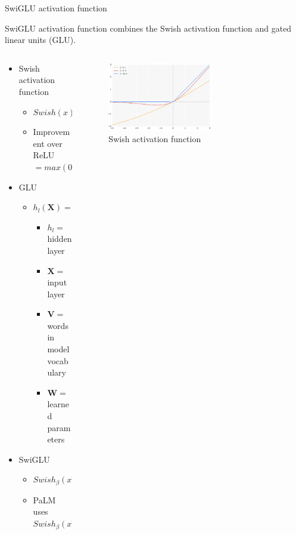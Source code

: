 \documentclass{beamer}
\begin{document}
\begin{frame}{SwiGLU activation function\cite{swiglu}}
  \scriptsize

  SwiGLU activation function combines the Swish activation function\cite{swish} and gated linear units (GLU)\cite{glu}.

  \begin{columns}
    \begin{column}{0.55\textwidth}
      \begin{itemize}
        \item Swish activation function
        \begin{itemize}
          \item $Swish(x) = x\sigma(\beta x), \sigma(z) = (1+e^{-z})^{-1}$
          \item Improvement over ReLU $=max(0,x)$
        \end{itemize}
        \item GLU
        \begin{itemize}
          \item $h_l(\mathbf{X}) = (\mathbf{X} * \mathbf{W}+ b) \otimes (\mathbf{X} * \mathbf{V} + c)$
          \begin{itemize}
            \item $h_l = $ hidden layer
            \item $\mathbf{X} = $ input layer
            \item $\mathbf{V} = $ words in model vocabulary
            \item $\mathbf{W} = $ learned parameters
          \end{itemize}
        \end{itemize}
        \item SwiGLU
        \begin{itemize}
          \item $Swish_{\beta}(x\mathbf{W}+ b) \otimes (x\mathbf{V} + c)$
          \item PaLM uses $Swish_{\beta}(x \mathbf{W}) \otimes (x \mathbf{V})$
        \end{itemize}
      \end{itemize}
    \end{column}
    \begin{column}{0.5\textwidth}
      \begin{figure}[ht!]
        \includegraphics[width=0.6\textwidth]{images/swish_act.png}
        \caption{Swish activation function\cite{swish}}
      \end{figure}
    \end{column}
  \end{columns}
  
\end{frame}
\end{document}
